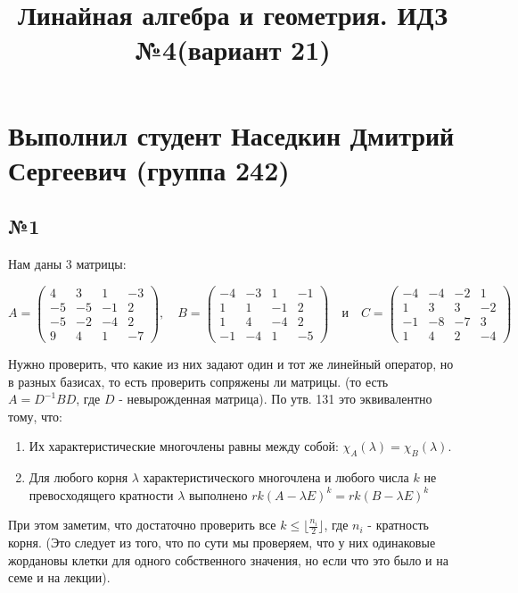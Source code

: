 \documentclass[11pt]{article}
\title{Линайная алгебра и геометрия. ИДЗ №4(вариант 21)}
\author{}
\date{}
\begin{document}
\maketitle

\section*{Выполнил студент Наседкин Дмитрий Сергеевич (группа 242)}

\subsection*{№1}
Нам даны 3 матрицы:

$$
A = \begin{pmatrix}
4 & 3 & 1 & -3 \\
-5 & -5 & -1 & 2 \\
-5 & -2 & -4 & 2 \\
9 & 4 & 1 & -7
\end{pmatrix}, \quad
B = \begin{pmatrix}
-4 & -3 & 1 & -1 \\
1 & 1 & -1 & 2 \\
1 & 4 & -4 & 2 \\
-1 & -4 & 1 & -5
\end{pmatrix} \quad \text{и} \quad
C = \begin{pmatrix}
-4 & -4 & -2 & 1 \\
1 & 3 & 3 & -2 \\
-1 & -8 & -7 & 3 \\
1 & 4 & 2 & -4
\end{pmatrix}
$$

Нужно проверить, что какие из них задают один и тот же линейный оператор, но в разных базисах, то есть проверить сопряжены ли матрицы. (то есть $A = D^{-1}BD$, где $D$ - невырожденная матрица). По утв. 131 это эквивалентно тому, что:

\begin{enumerate}
  \item Их характеристические многочлены равны между собой: $\chi_A(\lambda) = \chi_B(\lambda)$.
  \item Для любого корня $\lambda$ характеристического многочлена и любого числа $k$ не превосходящего кратности $\lambda$ выполнено $rk(A − \lambda E)^k = rk(B − \lambda E)^k$
\end{enumerate}

При этом заметим, что достаточно проверить все $k \leq \lfloor \frac{n_i}{2} \rfloor$, где $n_i$ - кратность корня. (Это следует из того, что по сути мы проверяем, что у них одинаковые жордановы клетки для одного собственного значения, но если что это было и на семе и на лекции).
\end{document}
